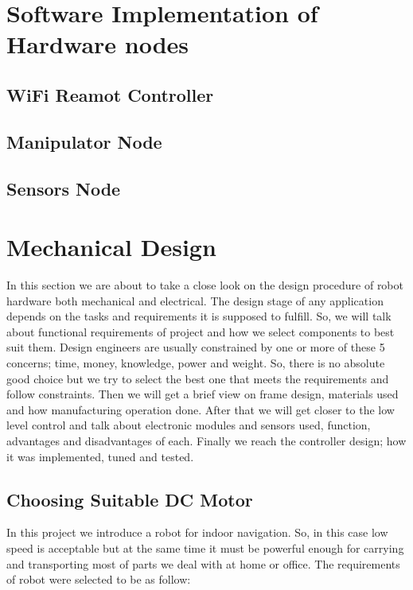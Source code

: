 \documentclass[12pt]{article}
\begin{document}
\newpage

\section{Software Implementation of Hardware nodes}
\subsection{WiFi Reamot Controller}
\subsection{Manipulator Node}
\subsection{Sensors Node}

\newpage

\section{Mechanical Design}
In this section we are about to take a close look on the design procedure of robot hardware both mechanical and electrical. The design stage of any application depends on the tasks and requirements it is supposed to fulfill. So, we will talk about functional requirements of project and how we select components to best suit them. Design engineers are usually constrained by one or more of these 5 concerns; time, money, knowledge, power and weight. So, there is no absolute good choice but we try to select the best one that meets the requirements and follow constraints. \cite{203} Then we will get a brief view on frame design, materials used and how manufacturing operation done. After that we will get closer to the low level control and talk about electronic modules and sensors used, function, advantages and disadvantages of each. Finally we reach the controller design; how it was implemented, tuned and tested.  

\subsection{Choosing Suitable DC Motor  \cite{203}}
In this project we introduce a robot for indoor navigation. So, in this case low speed is acceptable but at the same time it must be powerful enough for carrying and transporting most of parts we deal with at home or office. The requirements of robot were selected to be as follow:
\end{document}
